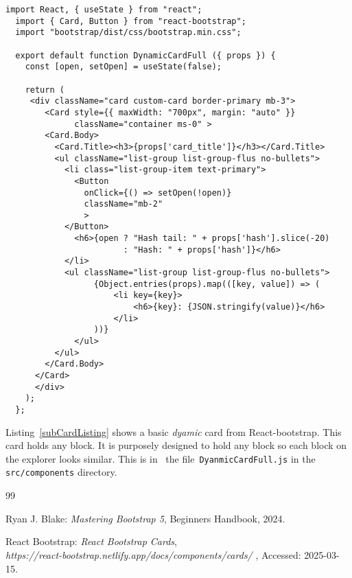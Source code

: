 \documentclass[12pt]{article}
\begin{document}
%
%
\pagebreak
%
%
%
\begin{lstlisting}[label=subCardListing,style=JSES6Base, caption={Basic Dynamic Card for a Stacks block}]
  import React, { useState } from "react";
  import { Card, Button } from "react-bootstrap";
  import "bootstrap/dist/css/bootstrap.min.css";
  
  export default function DynamicCardFull ({ props }) {
    const [open, setOpen] = useState(false);
  
    return (
     <div className="card custom-card border-primary mb-3">
        <Card style={{ maxWidth: "700px", margin: "auto" }} 
              className="container ms-0" >
        <Card.Body>
          <Card.Title><h3>{props['card_title']}</h3></Card.Title>
          <ul className="list-group list-group-flus no-bullets">
            <li class="list-group-item text-primary">
              <Button
                onClick={() => setOpen(!open)}
                className="mb-2"
                >
            </Button>
              <h6>{open ? "Hash tail: " + props['hash'].slice(-20) 
                        : "Hash: " + props['hash']}</h6>
            </li>
            <ul className="list-group list-group-flus no-bullets">
                  {Object.entries(props).map(([key, value]) => (
                      <li key={key}>
                          <h6>{key}: {JSON.stringify(value)}</h6>
                      </li>
                  ))}
              </ul>
          </ul>
        </Card.Body>
      </Card>
      </div>
    );
  };
\end{lstlisting}

Listing~\ref{subCardListing} shows a basic {\em dyamic} card from React-bootstrap.
This card holds any block. 
It is purposely designed to hold any block so each block on the explorer looks similar.
This is in~ the file~\lstinline[language=bash]|DyanmicCardFull.js| in the \lstinline[language=bash]|src/components| directory.




%
%
%
%
\begin {thebibliography}{99}
%



 Ryan J. Blake:
	      {\em Mastering Bootstrap 5},
	     Beginners Handbook,
       2024.

       
 React Bootstrap:
        {\em React Bootstrap Cards},\\
        {\em https://react-bootstrap.netlify.app/docs/components/cards/ },
       Accessed: 2025-03-15.

\end {thebibliography}
\end{document}
